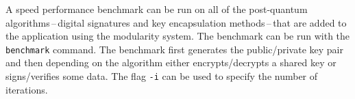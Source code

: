 A speed performance benchmark can be run on all of the post-quantum algorithms\,--\,digital signatures and key encapsulation methods\,--\,that are added to the application using the modularity system. The benchmark can be run with the \texttt{benchmark} command. The benchmark first generates the public/private key pair and then depending on the algorithm either encrypts/decrypts a shared key or signs/verifies some data. The flag \texttt{-i} can be used to specify the number of iterations.

